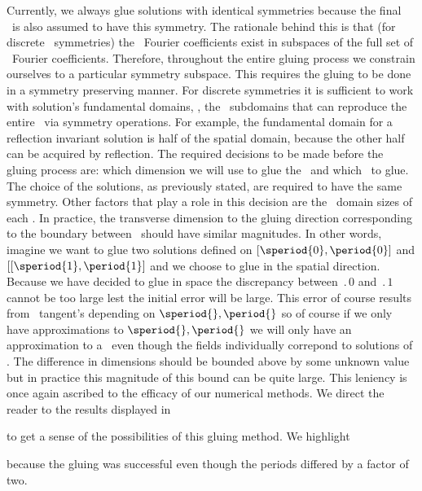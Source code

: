 Currently, we always glue solutions with identical symmetries because
the final \twot\ is also assumed to have this symmetry. The rationale
behind this is that (for discrete \spt\ symmetries) the \spt\ Fourier coefficients
exist in subspaces of the full set of \spt\ Fourier coefficients. Therefore,
throughout the entire gluing process we constrain ourselves to
a particular symmetry subspace. This requires the gluing
to be done in a symmetry preserving manner. For discrete symmetries
it is sufficient to work with solution's fundamental domains, \ie, the
\spt\ subdomains that can reproduce the entire \twot\ via
symmetry operations. For example, the fundamental domain
for a reflection invariant solution is half of the spatial domain, because the
other half can be acquired by reflection.
The required decisions to be made before the gluing
process are: which dimension we will use to glue
the \twots\ and which \twots\ to glue.
The choice of the solutions, as
previously stated, are required to have the same symmetry.
Other factors that play a role in this decision
are the \spt\ domain sizes of each \twot.
In practice, the transverse dimension to the gluing direction corresponding
to the boundary between \twots\ should have similar magnitudes.
In other words, imagine we want to
glue two solutions defined on $[\speriod{0},\period{0}]$
and $[[\speriod{1},\period{1}]$ and we choose to glue
in the spatial direction.
Because we have decided to glue in space the discrepancy between
$\period{0}$ and $\period{1}$ cannot be too large lest the initial error will
be large. This error of course results from \twots\ tangent's depending on $\speriod{},\period{}$ so
of course if we only have approximations to $\speriod{},\period{}$ we will
only have an approximation to a \twot\ even though the fields individually correpond
to solutions of . The difference in
dimensions should be bounded above by some unknown value but in practice
this magnitude of this bound can be quite large. This leniency is once again
ascribed to the efficacy of our numerical methods.
We direct the reader to the results displayed in

to get a sense of the possibilities of
this gluing method. We highlight

because
the gluing was successful even though the periods differed by a factor of two.

